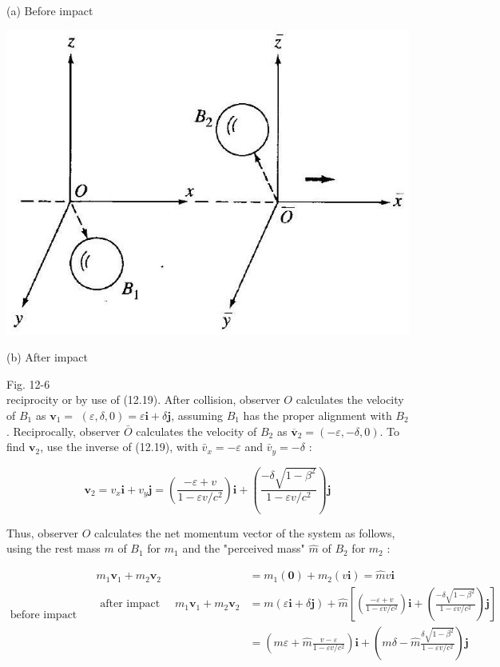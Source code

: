 \documentclass[10pt]{article}
\begin{document}
(a) Before impact

\begin{center}
\includegraphics[max width=\textwidth]{2024_04_03_41f90be4f896e21f0dc9g-192(1)}
\end{center}

(b) After impact

Fig. 12-6\\
reciprocity or by use of (12.19). After collision, observer $O$ calculates the velocity of $B_{1}$ as $\mathbf{v}_{1}=$ $(\varepsilon, \delta, 0)=\varepsilon \mathbf{i}+\delta \mathbf{j}$, assuming $B_{1}$ has the proper alignment with $B_{2}$. Reciprocally, observer $\bar{O}$ calculates the velocity of $B_{2}$ as $\overline{\mathbf{v}}_{2}=(-\varepsilon,-\delta, 0)$. To find $\mathbf{v}_{2}$, use the inverse of (12.19), with $\bar{v}_{x}=-\varepsilon$ and $\bar{v}_{y}=-\delta$ :

$$
\mathbf{v}_{2}=v_{x} \mathbf{i}+v_{y} \mathbf{j}=\left(\frac{-\varepsilon+v}{1-\varepsilon v / c^{2}}\right) \mathbf{i}+\left(\frac{-\delta \sqrt{1-\beta^{2}}}{1-\varepsilon v / c^{2}}\right) \mathbf{j}
$$

Thus, observer $O$ calculates the net momentum vector of the system as follows, using the rest mass $m$ of $B_{1}$ for $m_{1}$ and the "perceived mass" $\hat{m}$ of $B_{2}$ for $m_{2}$ :

$$
\text { before impact } \quad \begin{aligned}
m_{1} \mathbf{v}_{1}+m_{2} \mathbf{v}_{2} & =m_{1}(\mathbf{0})+m_{2}(v \mathbf{i})=\hat{m} v \mathbf{i} \\
\text { after impact } \quad m_{1} \mathbf{v}_{1}+m_{2} \mathbf{v}_{2} & =m(\varepsilon \mathbf{i}+\delta \mathbf{j})+\hat{m}\left[\left(\frac{-\varepsilon+v}{1-\varepsilon v / c^{2}}\right) \mathbf{i}+\left(\frac{-\delta \sqrt{1-\beta^{2}}}{1-\varepsilon v / c^{2}}\right) \mathbf{j}\right] \\
& =\left(m \varepsilon+\hat{m} \frac{v-\varepsilon}{1-\varepsilon v / c^{2}}\right) \mathbf{i}+\left(m \delta-\hat{m} \frac{\delta \sqrt{1-\beta^{2}}}{1-\varepsilon v / c^{2}}\right) \mathbf{j}
\end{aligned}
$$
\end{document}
